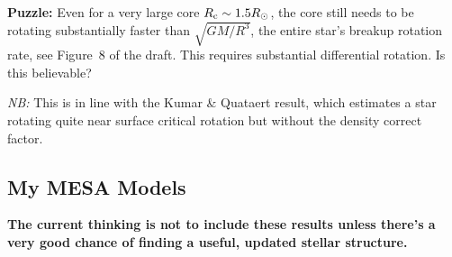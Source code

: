 \documentclass[11pt,
        usenames, %
        dvipsnames %
    ]{article}
\begin{document}
\textbf{Puzzle:} Even for a very large core $R_{\rm c} \sim 1.5R_{\odot}$, the
core still needs to be rotating substantially faster than $\sqrt{GM/R^3}$, the
entire star's breakup rotation rate, see Figure~8 of the draft. This requires
substantial differential rotation. Is this believable?

\emph{NB:} This is in line with the Kumar \& Quataert result, which estimates a
star rotating quite near surface critical rotation but without the density
correct factor.

\subsection{My MESA Models}

\textbf{The current thinking is not to include these results unless there's a
very good chance of finding a useful, updated stellar structure.}
\end{document}
